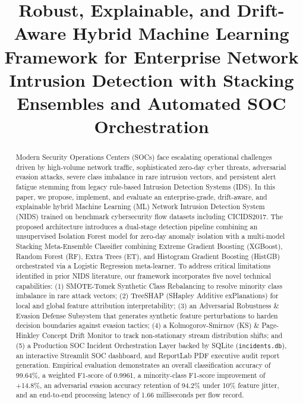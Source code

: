 \documentclass[conference]{IEEEtran}
\begin{document}
\title{Robust, Explainable, and Drift-Aware Hybrid Machine Learning Framework for Enterprise Network Intrusion Detection with Stacking Ensembles and Automated SOC Orchestration}

\author{
}

\maketitle

\begin{abstract}
Modern Security Operations Centers (SOCs) face escalating operational challenges driven by high-volume network traffic, sophisticated zero-day cyber threats, adversarial evasion attacks, severe class imbalance in rare intrusion vectors, and persistent alert fatigue stemming from legacy rule-based Intrusion Detection Systems (IDS). In this paper, we propose, implement, and evaluate an enterprise-grade, drift-aware, and explainable hybrid Machine Learning (ML) Network Intrusion Detection System (NIDS) trained on benchmark cybersecurity flow datasets including CICIDS2017. The proposed architecture introduces a dual-stage detection pipeline combining an unsupervised Isolation Forest model for zero-day anomaly isolation with a multi-model Stacking Meta-Ensemble Classifier combining Extreme Gradient Boosting (XGBoost), Random Forest (RF), Extra Trees (ET), and Histogram Gradient Boosting (HistGB) orchestrated via a Logistic Regression meta-learner. To address critical limitations identified in prior NIDS literature, our framework incorporates five novel technical capabilities: (1) SMOTE-Tomek Synthetic Class Rebalancing to resolve minority class imbalance in rare attack vectors; (2) TreeSHAP (SHapley Additive exPlanations) for local and global feature attribution interpretability; (3) an Adversarial Robustness \& Evasion Defense Subsystem that generates synthetic feature perturbations to harden decision boundaries against evasion tactics; (4) a Kolmogorov-Smirnov (KS) \& Page-Hinkley Concept Drift Monitor to track non-stationary stream distribution shifts; and (5) a Production SOC Incident Orchestration Layer backed by SQLite (\texttt{incidents.db}), an interactive Streamlit SOC dashboard, and ReportLab PDF executive audit report generation. Empirical evaluation demonstrates an overall classification accuracy of 99.64\%, a weighted F1-score of 0.9961, a minority-class F1-score improvement of +14.8\%, an adversarial evasion accuracy retention of 94.2\% under 10\% feature jitter, and an end-to-end processing latency of 1.66 milliseconds per flow record.
\end{abstract}
\end{document}
